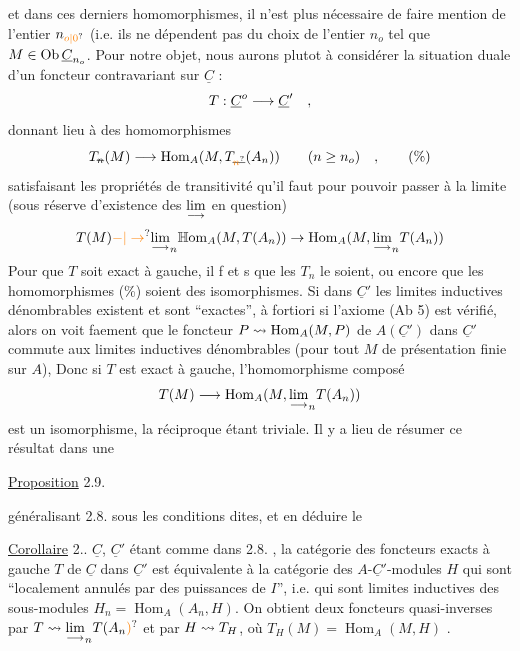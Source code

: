et dans ces derniers homomorphismes, il n'est plus nécessaire de faire
mention de l'entier $n_{\unsure{o|0}}$ (i.e. ils ne dépendent pas du choix de l'entier
$n_o$ tel que $M\in\mathrm{Ob}\,\underline C_{n_o}$\handwritten{)}. Pour notre objet, nous aurons plutot à considérer la situation duale d'un foncteur contravariant sur $\underline C$ :
\[
T:\underline C^o\longrightarrow\underline C'\quad,
\]
donnant lieu à des homomorphismes
\[
T_{\deleted{n}}(M)\handwritten{\longrightarrow}\operatorname{Hom}_A(M,T_{\deleted{\unsure{n}}}(A_n))\qquad(n\handwritten{\geq}n_o)\quad,\tag*{(\%)}
\]
satisfaisant les propriétés de transitivité qu'il faut pour pouvoir passer
à la limite (sous réserve d'existence des $\underset{\longrightarrow}{\lim}$ en question)
\[
T(M)\handwritten{\unsure{-|\to}}\underset{\handwritten{\longrightarrow}}{\lim}_{\handwritten{n}}\mathbb H\mathrm{om}_A(M,T(A_n))\handwritten{\to}\operatorname{Hom}_A(M,\underset{\handwritten{\longrightarrow}}{\lim}_{\handwritten{n}}T(A_n))
\]
Pour que $T$ soit exact à gauche, il f et s que les $T_n$ le soient, ou encore
que les homomorphismes (\%) soient des isomorphismes. Si dans $\underline C'$ les
limites inductives  dénombrables existent et sont ``exactes'', à fortiori
si l'axiome (Ab 5) est vérifié, alors  on voit faement que le foncteur
$P\leadsto\operatorname{Hom}_A(M,P)$ de  $A(\underline C')$ dans $\underline C'$ commute aux limites inductives  dénombrables (pour tout $M$ de présentation finie sur $A$), Donc  si
 $T$ est exact à gauche, l'homomorphisme composé
\[
T(M)\longrightarrow\operatorname{Hom}_A(M,\underset{\longrightarrow}{\lim}_{n}T(A_n))
\]
est un isomorphisme, la réciproque étant triviale. Il y a lieu de
résumer ce résultat dans une

\uline{Proposition} 2.9.

généralisant 2.8. sous les conditions dites, et en déduire le

\uline{Corollaire} 2.. $\underline C$, $\underline C'$ étant comme dans 2.8. , la catégorie des
foncteurs exacts à  gauche $T$ de $\underline C$ dans $\underline C'$ est équivalente à la
catégorie des $A$-$\underline C'$-modules $H$ qui sont ``localement annulés par des
puissances de $I$'', i.e. qui sont limites inductives des sous-modules
$H_n=\operatorname{Hom}_A(A_n,H)$. On obtient deux foncteurs quasi-inverses par $T\handwritten{\leadsto}\underset{\handwritten{\longrightarrow}}{\lim}_{\handwritten{n}}T(A_n\unsure{)}$
et par $H\leadsto T_H$, où $T_H(M)=\operatorname{Hom}_A(M,H)$ .

